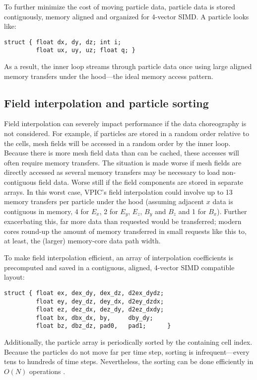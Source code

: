 \documentclass[letter,10pt]{article}
\begin{document}
To further minimize the cost of moving particle data, particle data is
stored contiguously, memory aligned and organized for 4-vector SIMD.
A particle looks like:
\begin{verbatim}
struct { float dx, dy, dz; int i;
         float ux, uy, uz; float q; }
\end{verbatim}
As a result, the inner loop streams through particle data once using
large aligned memory transfers under the hood---the ideal memory
access pattern.

\subsection{Field interpolation and particle sorting}

Field interpolation can severely impact performance if the data
choreography is not considered.  For example, if particles are stored
in a random order relative to the cells, mesh fields will be accessed
in a random order by the inner loop.  Because there is more mesh field
data than can be cached, these accesses will often require memory
transfers.  The situation is made worse if mesh fields are directly
accessed as several memory transfers may be necessary to load
non-contiguous field data.  Worse still if the field components are
stored in separate arrays.  In this worst case, VPIC's field
interpolation could involve up to 13 memory transfers per particle
under the hood (assuming adjacent $x$ data is contiguous in memory, 4
for $E_x$, 2 for $E_y$, $E_z$, $B_y$ and $B_z$ and 1 for $B_x$).
Further exacerbating this, far more data than requested would be
transferred; modern cores round-up the amount of memory transferred in
small requests like this to, at least, the (larger) memory-core data
path width.

To make field interpolation efficient, an array of interpolation
coefficients is precomputed and saved in a contiguous, aligned,
4-vector SIMD compatible layout:
\begin{verbatim}
struct { float ex, dex_dy, dex_dz, d2ex_dydz;
         float ey, dey_dz, dey_dx, d2ey_dzdx;
         float ez, dez_dx, dez_dy, d2ez_dxdy;
         float bx, dbx_dx, by,     dby_dy;
         float bz, dbz_dz, pad0,   pad1;      }
\end{verbatim}
Additionally, the particle array is periodically sorted by the
containing cell index.  Because the particles do not move far per time
step, sorting is infrequent---every tens to hundreds of time steps.
Nevertheless, the sorting can be done efficiently in $O(N)$ operations
\cite{Bowers_2001}.
\end{document}
